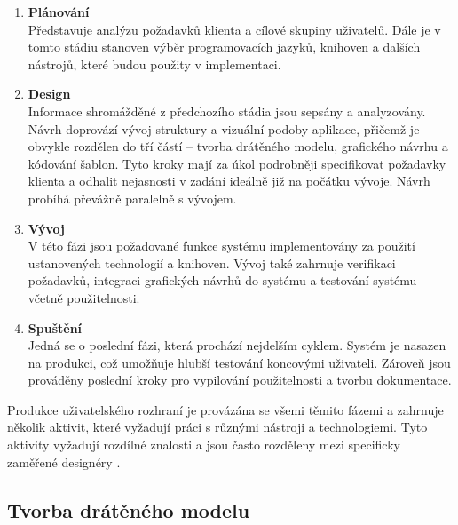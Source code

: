\begin{enumerate}[leftmargin=1cm]
    \item \textbf{Plánování}\\
          Představuje analýzu požadavků klienta a cílové skupiny uživatelů. Dále je v tomto stádiu stanoven výběr programovacích jazyků, knihoven a dalších nástrojů, které budou použity v implementaci.

    \item \textbf{Design}\\
          Informace shromážděné z předchozího stádia jsou sepsány a analyzovány. Návrh doprovází vývoj struktury a vizuální podoby aplikace, přičemž je obvykle rozdělen do tří částí -- tvorba drátěného modelu, grafického návrhu a kódování šablon. Tyto kroky mají za úkol podrobněji specifikovat požadavky klienta a odhalit nejasnosti v zadání ideálně již na počátku vývoje. Návrh probíhá převážně paralelně s vývojem.

    \item \textbf{Vývoj}\\
          V této fázi jsou požadované funkce systému implementovány za použití ustanovených technologií a knihoven. Vývoj také zahrnuje verifikaci požadavků, integraci grafických návrhů do systému a testování systému včetně použitelnosti.

    \item \textbf{Spuštění}\\
          Jedná se o poslední fázi, která prochází nejdelším cyklem. Systém je nasazen na produkci, což umožňuje hlubší testování koncovými uživateli. Zároveň jsou prováděny poslední kroky pro vypilování použitelnosti a tvorbu dokumentace.

\end{enumerate}

Produkce uživatelského rozhraní je provázána se všemi těmito fázemi a zahrnuje několik aktivit, které vyžadují práci s různými nástroji a technologiemi. Tyto aktivity vyžadují rozdílné znalosti a jsou často rozděleny mezi specificky zaměřené designéry \cite{5}.

\subsection{Tvorba drátěného modelu}
\label{sec:wireframing}

